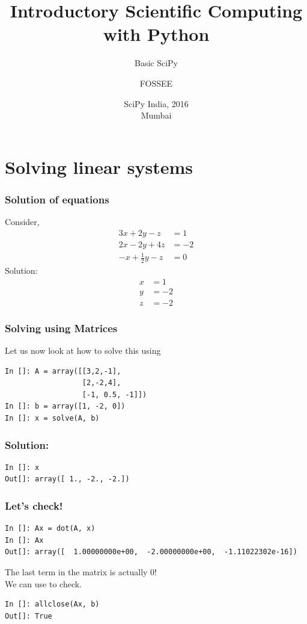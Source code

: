 \documentclass[14pt,compress]{beamer}
\title[Basic SciPy and Mayavi]{Introductory Scientific Computing with
Python}
\subtitle{Basic SciPy}
\author[Prabhu] {FOSSEE}
\institute[FOSSEE -- IITB] {Department of Aerospace Engineering\\IIT Bombay}
\date[] {SciPy India, 2016\\
Mumbai
}
\newcounter{time}
\newcommand{\inctime}[1]{\addtocounter{time}{#1}{\tiny \thetime\ m}}
\newcommand{\kwrd}[1]{ \texttt{\textbf{\color{blue}{#1}}}  }
\begin{document}
\begin{frame}
  \maketitle
\end{frame}


\section{Solving linear systems}

\begin{frame}[fragile]
\frametitle{Solution of equations}
Consider,
  \begin{align*}
    3x + 2y - z  & = 1 \\
    2x - 2y + 4z  & = -2 \\
    -x + \frac{1}{2}y -z & = 0
  \end{align*}
Solution:
  \begin{align*}
    x & = 1 \\
    y & = -2 \\
    z & = -2
  \end{align*}
\end{frame}

\begin{frame}[fragile]
\frametitle{Solving using Matrices}
Let us now look at how to solve this using \kwrd{matrices}
  \begin{lstlisting}
In []: A = array([[3,2,-1],
                  [2,-2,4],
                  [-1, 0.5, -1]])
In []: b = array([1, -2, 0])
In []: x = solve(A, b)
  \end{lstlisting}
\end{frame}

\begin{frame}[fragile]
\frametitle{Solution:}
\begin{lstlisting}
In []: x
Out[]: array([ 1., -2., -2.])
\end{lstlisting}
\end{frame}

\begin{frame}[fragile]
\frametitle{Let's check!}
\begin{small}
\begin{lstlisting}
In []: Ax = dot(A, x)
In []: Ax
Out[]: array([  1.00000000e+00,  -2.00000000e+00,  -1.11022302e-16])
\end{lstlisting}
\end{small}
\begin{block}{}
The last term in the matrix is actually \alert{0}!\\
We can use \kwrd{allclose()} to check.
\end{block}
\begin{lstlisting}
In []: allclose(Ax, b)
Out[]: True
\end{lstlisting}
\inctime{10}
\end{frame}
\end{document}
